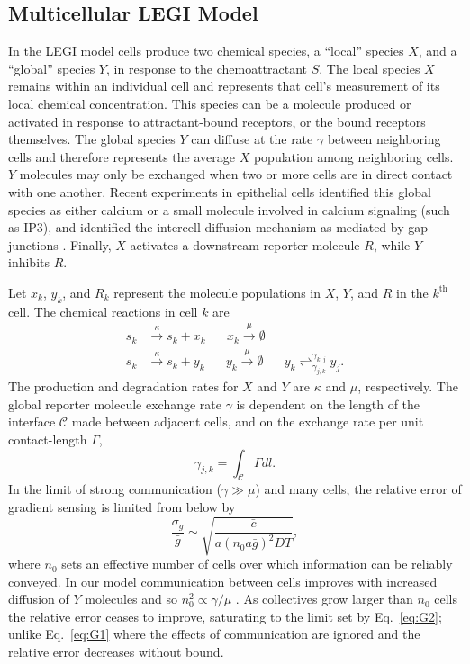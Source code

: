 \subsection{Multicellular LEGI Model}

In the LEGI model cells produce two chemical species, a ``local'' species $X$, and a ``global'' species $Y$, in response to the chemoattractant $S$. The local species $X$ remains within an individual cell and represents that cell's measurement of its local chemical concentration. This species can be a molecule produced or activated in response to attractant-bound receptors, or the bound receptors themselves. The global species $Y$ can diffuse at the rate $\gamma$ between neighboring cells and therefore represents the average $X$ population among neighboring cells. $Y$ molecules may only be exchanged when two or more cells are in direct contact with one another. Recent experiments in epithelial cells identified this global species as either calcium or a small molecule involved in calcium signaling (such as IP3), and identified the intercell diffusion mechanism as mediated by gap junctions \cite{ellison2016cell}. Finally, $X$ activates a downstream reporter molecule $R$, while $Y$ inhibits $R$.

Let $x_k$, $y_k$, and $R_k$ represent the molecule populations in $X$, $Y$, and $R$ in the $k^\text{th}$ cell. The chemical reactions in cell $k$ are
\begin{equation}
    \begin{aligned}
        s_k &\xrightarrow{\kappa} s_k + x_k \hspace{20pt} x_k \xrightarrow{\mu} \emptyset \\
        s_k &\xrightarrow{\kappa} s_k + y_k \hspace{20pt} y_k \xrightarrow{\mu} \emptyset \hspace{20pt} y_k \rightleftharpoons_{\gamma_{j,k}}^{\gamma_{k,j}} y_{j} .
    \end{aligned}
\end{equation}
The production and degradation rates for $X$ and $Y$ are $\kappa$ and $\mu$, respectively. The global reporter molecule exchange rate $\gamma$ is dependent on the length of the interface $\mathcal{C}$ made between adjacent cells, and on the exchange rate per unit contact-length $\Gamma$,
$$\gamma_{j,k} = \int_{\mathcal{C}} \Gamma dl . $$
In the limit of strong communication ($\gamma \gg \mu$) and many cells, the relative error of gradient sensing is limited from below by \cite{mugler2016limits}
\begin{equation} \label{eq:G2}
\frac{\sigma_g}{\bar{g}} \sim \sqrt{\frac{\bar{c}}{a(n_0a\bar{g})^2DT}},
\end{equation}
where $n_0$ sets an effective number of cells over which information can be reliably conveyed. In our model communication between cells improves with increased diffusion of $Y$ molecules and so $n_0^2 \propto \gamma/\mu$ \cite{ellison2016cell, mugler2016limits}. As collectives grow larger than $n_0$ cells the relative error ceases to improve, saturating to the limit set by Eq.\ \ref{eq:G2}; unlike Eq.\ \ref{eq:G1} where the effects of communication are ignored and the relative error decreases without bound.

